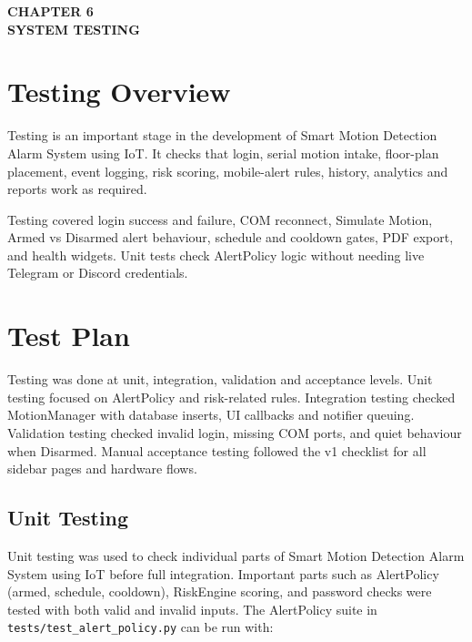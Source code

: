 \documentclass[12pt,a4paper]{report}
\begin{document}

\cleardoublepage
\thispagestyle{empty}

\null
\vfill

\begin{center}
    {\fontsize{16pt}{18pt}\selectfont\bfseries
    CHAPTER 6}\\[0.5cm]

    {\fontsize{16pt}{18pt}\selectfont\bfseries
    SYSTEM TESTING}
\end{center}

\vfill
\null

\clearpage

\section{Testing Overview}

Testing is an important stage in the development of Smart Motion Detection Alarm System using IoT. It checks that login, serial motion intake, floor-plan placement, event logging, risk scoring, mobile-alert rules, history, analytics and reports work as required.

Testing covered login success and failure, COM reconnect, Simulate Motion, Armed vs Disarmed alert behaviour, schedule and cooldown gates, PDF export, and health widgets. Unit tests check AlertPolicy logic without needing live Telegram or Discord credentials.

\section{Test Plan}

Testing was done at unit, integration, validation and acceptance levels. Unit testing focused on AlertPolicy and risk-related rules. Integration testing checked MotionManager with database inserts, UI callbacks and notifier queuing. Validation testing checked invalid login, missing COM ports, and quiet behaviour when Disarmed. Manual acceptance testing followed the v1 checklist for all sidebar pages and hardware flows.

\subsection{Unit Testing}

Unit testing was used to check individual parts of Smart Motion Detection Alarm System using IoT before full integration. Important parts such as AlertPolicy (armed, schedule, cooldown), RiskEngine scoring, and password checks were tested with both valid and invalid inputs. The AlertPolicy suite in \texttt{tests/test\_alert\_policy.py} can be run with:
\end{document}

